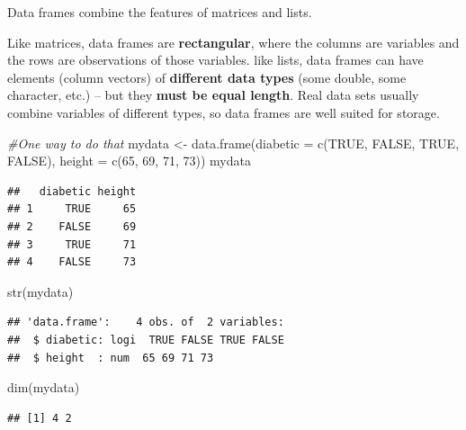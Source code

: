 \documentclass[
]{book}
\newenvironment{Shaded}{\begin{snugshade}}{\end{snugshade}}
\newcommand{\AttributeTok}[1]{\textcolor[rgb]{0.77,0.63,0.00}{#1}}
\newcommand{\CommentTok}[1]{\textcolor[rgb]{0.56,0.35,0.01}{\textit{#1}}}
\newcommand{\ConstantTok}[1]{\textcolor[rgb]{0.00,0.00,0.00}{#1}}
\newcommand{\DecValTok}[1]{\textcolor[rgb]{0.00,0.00,0.81}{#1}}
\newcommand{\FunctionTok}[1]{\textcolor[rgb]{0.00,0.00,0.00}{#1}}
\newcommand{\NormalTok}[1]{#1}
\newcommand{\OtherTok}[1]{\textcolor[rgb]{0.56,0.35,0.01}{#1}}
\begin{document}
Data frames combine the features of matrices and lists.

Like matrices, data frames are \textbf{rectangular}, where the columns are variables and the rows are observations of those variables. like lists, data frames can have elements (column vectors) of \textbf{different data types} (some double, some character, etc.) -- but they \textbf{must be equal length}. Real data sets usually combine variables of different types, so data frames are well suited for storage.

\begin{Shaded}
\begin{Highlighting}[]
\CommentTok{\#One way to do that}
\NormalTok{mydata }\OtherTok{\textless{}{-}} \FunctionTok{data.frame}\NormalTok{(}\AttributeTok{diabetic =} \FunctionTok{c}\NormalTok{(}\ConstantTok{TRUE}\NormalTok{, }\ConstantTok{FALSE}\NormalTok{, }\ConstantTok{TRUE}\NormalTok{, }\ConstantTok{FALSE}\NormalTok{), }
                     \AttributeTok{height =} \FunctionTok{c}\NormalTok{(}\DecValTok{65}\NormalTok{, }\DecValTok{69}\NormalTok{, }\DecValTok{71}\NormalTok{, }\DecValTok{73}\NormalTok{))}
\NormalTok{mydata}
\end{Highlighting}
\end{Shaded}

\begin{verbatim}
##   diabetic height
## 1     TRUE     65
## 2    FALSE     69
## 3     TRUE     71
## 4    FALSE     73
\end{verbatim}

\begin{Shaded}
\begin{Highlighting}[]
\FunctionTok{str}\NormalTok{(mydata)}
\end{Highlighting}
\end{Shaded}

\begin{verbatim}
## 'data.frame':    4 obs. of  2 variables:
##  $ diabetic: logi  TRUE FALSE TRUE FALSE
##  $ height  : num  65 69 71 73
\end{verbatim}

\begin{Shaded}
\begin{Highlighting}[]
\FunctionTok{dim}\NormalTok{(mydata)}
\end{Highlighting}
\end{Shaded}

\begin{verbatim}
## [1] 4 2
\end{verbatim}
\end{document}
